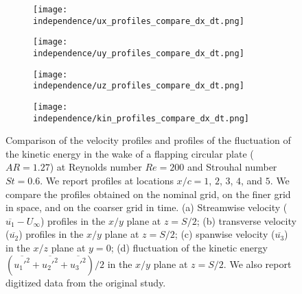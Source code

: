 \begin{figure}[!h]
  \centering
  \begin{subfigure}[c]{0.48\textwidth}
    \centering
    \texttt{[image: independence/ux\_profiles\_compare\_dx\_dt.png]}
    \caption{}
    \label{fig:independence_profiles:streamwise}
  \end{subfigure}
  \begin{subfigure}[c]{0.48\textwidth}
    \centering
    \texttt{[image: independence/uy\_profiles\_compare\_dx\_dt.png]}
    \caption{}
    \label{fig:independence_profiles:transverse}
  \end{subfigure}
  \begin{subfigure}[c]{0.48\textwidth}
    \centering
    \texttt{[image: independence/uz\_profiles\_compare\_dx\_dt.png]}
    \caption{}
    \label{fig:independence_profiles:spanwise}
  \end{subfigure}
  \begin{subfigure}[c]{0.48\textwidth}
    \centering
    \texttt{[image: independence/kin\_profiles\_compare\_dx\_dt.png]}
    \caption{}
    \label{fig:independence_profiles:kinetic}
  \end{subfigure}
  \caption{Comparison of the velocity profiles and profiles of the fluctuation of the kinetic energy in the wake of a flapping circular plate ($AR = 1.27$) at Reynolds number $Re = 200$ and Strouhal number $St = 0.6$. We report profiles at locations $x / c = 1$, $2$, $3$, $4$, and $5$. We compare the profiles obtained on the nominal grid, on the finer grid in space, and on the coarser grid in time. (a) Streamwise velocity ($\overline{u_1} - U_\infty$) profiles in the $x/y$ plane at $z = S / 2$; (b) transverse velocity ($\overline{u_2}$) profiles in the $x/y$ plane at $z = S / 2$; (c) spanwise velocity ($\overline{u_3}$) in the $x/z$ plane at $y = 0$; (d) fluctuation of the kinetic energy $( \overline{{u_1'}^2} + \overline{{u_2'}^2} + \overline{{u_3'}^2} ) / 2$ in the $x/y$ plane at $z = S / 2$. We also report digitized data from the original study.\supercite{li_dong_2016}}
  \label{fig:independence_profiles}
\end{figure}

